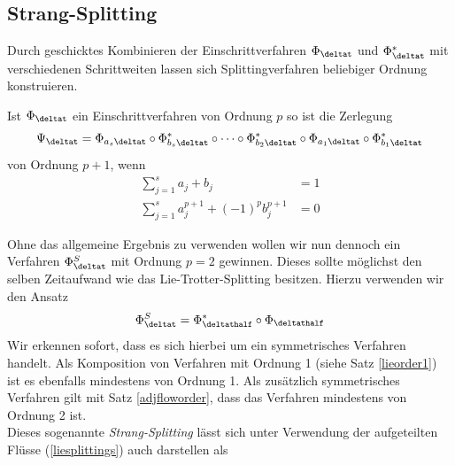 \subsection{Strang-Splitting}
\label{secstrang}
Durch geschicktes Kombinieren der Einschrittverfahren $\Phi_{\deltat}$ und $\Phi_{\deltat}^*$ mit verschiedenen Schrittweiten lassen sich Splittingverfahren beliebiger Ordnung konstruieren.
\begin{maththeorem}
Ist $\Phi_{\deltat}$ ein Einschrittverfahren von Ordnung $p$ so ist die Zerlegung
\[\Psi_{\deltat}=\Phi_{a_s\deltat}\circ \Phi_{b_s\deltat}^*\circ\dots\circ\Phi_{b_2\deltat}^*\circ\Phi_{a_1\deltat}\circ\Phi_{b_1\deltat}^*\]
von Ordnung $p+1$, wenn 
\begin{align*}
\sum_{j=1}^sa_j+b_j&=1\\
\sum_{j=1}^sa_j^{p+1}+(-1)^pb_j^{p+1}&=0
\end{align*}
\end{maththeorem}
Ohne das allgemeine Ergebnis zu verwenden wollen wir nun dennoch ein Verfahren $\Phi_{\deltat}^S$ mit Ordnung $p=2$ gewinnen. Dieses sollte möglichst den selben Zeitaufwand wie das Lie-Trotter-Splitting besitzen. Hierzu verwenden wir den Ansatz \[\Phi_{\deltat}^S=\Phi_{\deltathalf}^*\circ\Phi_{\deltathalf}\]
Wir erkennen sofort, dass es sich hierbei um ein symmetrisches Verfahren handelt. Als Komposition von Verfahren mit Ordnung 1 (siehe Satz \ref{lieorder1}) ist es ebenfalls mindestens von Ordnung 1. Als zusätzlich symmetrisches Verfahren gilt mit Satz \ref{adjfloworder}, dass das Verfahren mindestens von Ordnung 2 ist.\\
Dieses sogenannte \emph{Strang-Splitting} lässt sich unter Verwendung der aufgeteilten Flüsse (\ref{liesplittings}) auch darstellen als 

